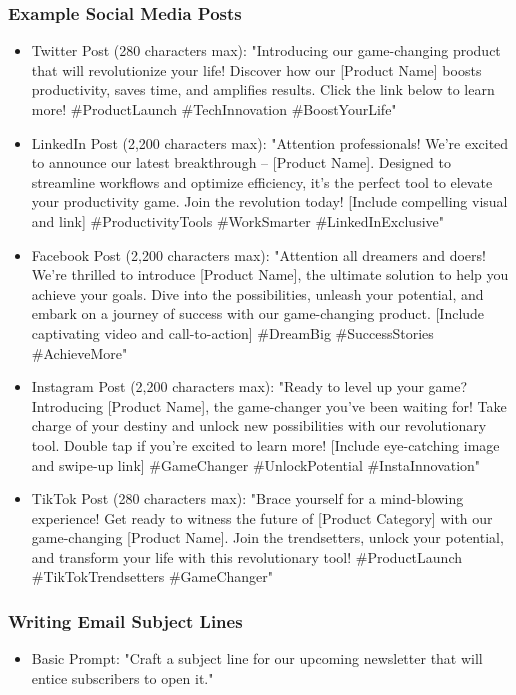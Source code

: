\begin{frame}[fragile]\frametitle{Example Social Media Posts}
\begin{itemize}
\item Twitter Post (280 characters max):
"Introducing our game-changing product that will revolutionize your life! Discover how our [Product Name] boosts productivity, saves time, and amplifies results. Click the link below to learn more! \#ProductLaunch \#TechInnovation \#BoostYourLife"
\item LinkedIn Post (2,200 characters max):
"Attention professionals! We're excited to announce our latest breakthrough – [Product Name]. Designed to streamline workflows and optimize efficiency, it's the perfect tool to elevate your productivity game. Join the revolution today! [Include compelling visual and link] \#ProductivityTools \#WorkSmarter \#LinkedInExclusive"
\item Facebook Post (2,200 characters max):
"Attention all dreamers and doers! We're thrilled to introduce [Product Name], the ultimate solution to help you achieve your goals. Dive into the possibilities, unleash your potential, and embark on a journey of success with our game-changing product. [Include captivating video and call-to-action] \#DreamBig \#SuccessStories \#AchieveMore"
\item Instagram Post (2,200 characters max):
"Ready to level up your game? Introducing [Product Name], the game-changer you've been waiting for! Take charge of your destiny and unlock new possibilities with our revolutionary tool. Double tap if you're excited to learn more! [Include eye-catching image and swipe-up link] \#GameChanger \#UnlockPotential \#InstaInnovation"
\item TikTok Post (280 characters max):
"Brace yourself for a mind-blowing experience! Get ready to witness the future of [Product Category] with our game-changing [Product Name]. Join the trendsetters, unlock your potential, and transform your life with this revolutionary tool! \#ProductLaunch \#TikTokTrendsetters \#GameChanger"
\end{itemize}
\end{frame}

\begin{frame}[fragile]\frametitle{Writing Email Subject Lines}
\begin{itemize}
\item Basic Prompt: "Craft a subject line for our upcoming newsletter that will entice subscribers to open it."
\end{itemize}
\end{frame}

